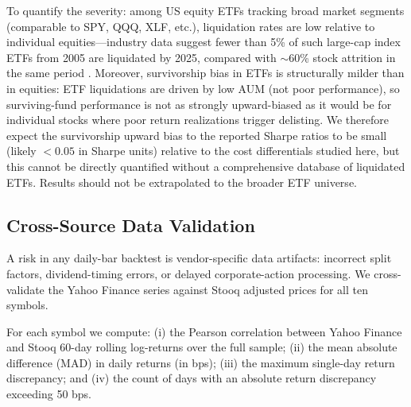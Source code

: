 \documentclass[12pt]{article}
\begin{document}
To quantify the severity: among US equity ETFs tracking broad market
segments (comparable to SPY, QQQ, XLF, etc.), liquidation rates are
low relative to individual equities---industry data suggest fewer than
5\% of such large-cap index ETFs from 2005 are liquidated by 2025,
compared with $\sim$60\% stock attrition in the same period
\citep{hou2020replicating}. Moreover, survivorship bias in ETFs is
structurally milder than in equities: ETF liquidations are driven by
low AUM (not poor performance), so surviving-fund performance is
not as strongly upward-biased as it would be for individual stocks
where poor return realizations trigger delisting. We therefore
expect the survivorship upward bias to the reported Sharpe ratios
to be small (likely $< 0.05$ in Sharpe units) relative to the
cost differentials studied here, but this cannot be directly
quantified without a comprehensive database of liquidated ETFs.
Results should not be extrapolated to the broader ETF universe.

\subsection{Cross-Source Data Validation}
\label{sec:crossval}

A risk in any daily-bar backtest is vendor-specific data artifacts:
incorrect split factors, dividend-timing errors, or delayed
corporate-action processing. We cross-validate the Yahoo Finance
series against Stooq adjusted prices for all ten symbols.

For each symbol we compute: (i) the Pearson correlation between
Yahoo Finance and Stooq 60-day rolling log-returns over the full
sample; (ii) the mean absolute difference (MAD) in daily returns
(in bps); (iii) the maximum single-day return discrepancy; and
(iv) the count of days with an absolute return discrepancy
exceeding 50 bps.
\end{document}
